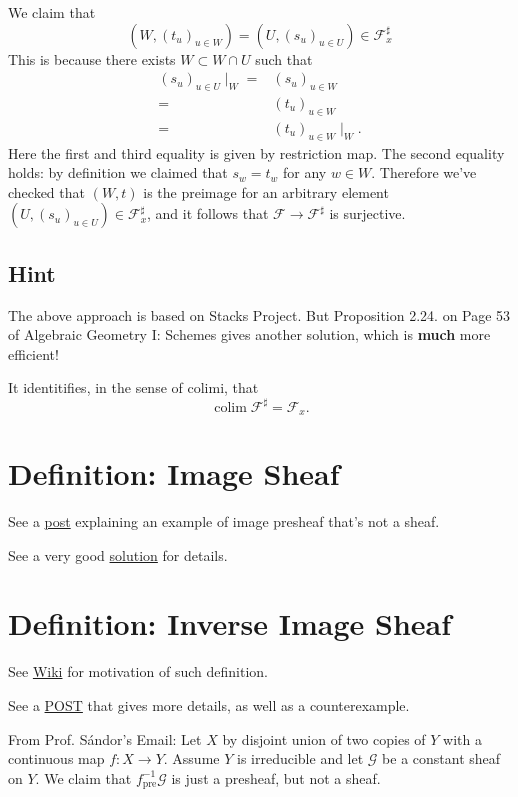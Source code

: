 We claim that \[(W,(t_u)_{u\in W})=(U,(s_u)_{u\in U})\in \mathscr F^{\sharp}_x\]
This is because there exists $W\subset W\cap U$ such that \begin{align*}
    (s_u)_{u\in U}\mid_W =& (s_u)_{u\in W}\\
    =& (t_u)_{u\in W}\\
    =& (t_u)_{u\in W}\mid_W.
\end{align*}Here the first and third equality is given by restriction map. The second equality holds: by definition we claimed that $s_w=t_w$ for any $w\in W$. Therefore we've checked that $(W,t)$ is the preimage for an arbitrary element $(U,(s_u)_{u\in U})\in \mathscr F^{\sharp}_x$, and it follows that $\mathscr F\to\mathscr F^{\sharp}$ is surjective.

\subsection{Hint}

The above approach is based on Stacks Project. But Proposition 2.24. on Page 53 of Algebraic Geometry I: Schemes \cite{gortz2020algebraic} gives another solution, which is \textbf{much} more efficient!

It identitifies, in the sense of colimi, that
\[\operatorname{colim}\mathscr F^{\sharp}=\mathscr F_x.\]
  
\section{Definition: Image Sheaf}

See a \href{https://math.stackexchange.com/questions/3838804/image-presheaf-which-is-not-a-sheaf}{post} explaining an example of image presheaf that's not a sheaf.

See a very good \href{https://www2.math.ethz.ch/education/bachelor/lectures/fs2016/math/alg_geom/Solution12.pdf}{solution} for details.

\section{Definition: Inverse Image Sheaf}

See \href{https://en.wikipedia.org/wiki/Inverse_image_functor}{Wiki} for motivation of such definition.

See a \href{https://en.wikipedia.org/wiki/Inverse_image_functor}{POST} that gives more details, as well as a counterexample.

From Prof. S\'andor's Email: Let $X$ by disjoint union of two copies of $Y$ with a continuous map $f:X\to Y$. Assume $Y$ is irreducible and let $\mathscr G$ be a constant sheaf on $Y$. We claim that $f^{-1}_{\text{pre}} \mathscr G$ is just a presheaf, but not a sheaf. 

